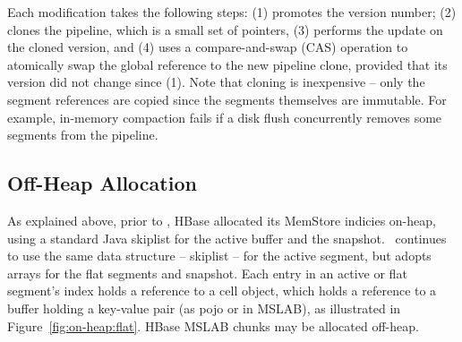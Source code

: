 Each modification takes the following steps:
(1) promotes the version number;
(2) clones the pipeline, which is a small set of pointers, 
(3) performs the update on the cloned version, and
(4) uses a compare-and-swap (CAS) operation to
atomically swap the global reference to the new pipeline clone, provided that its  version did not change since (1).
Note that cloning is inexpensive -- only the segment references are copied since the segments themselves are immutable. 
For example, in-memory
compaction fails if a disk flush concurrently removes some segments from the pipeline.


\subsection{Off-Heap  Allocation} \label{ssec:offheap}
As explained above, prior to \sys, HBase allocated its MemStore indicies on-heap, using a standard Java skiplist for the active buffer and the snapshot. \sys\ continues to use the same data structure -- skiplist -- for the active segment, but adopts arrays for the flat segments and snapshot. 
Each entry in an active or flat segment's index holds a reference to a cell object, which holds a reference to a buffer holding a key-value pair (as pojo or in MSLAB),
as illustrated in Figure~\ref{fig:on-heap:flat}. 
HBase MSLAB chunks may be allocated off-heap. 


